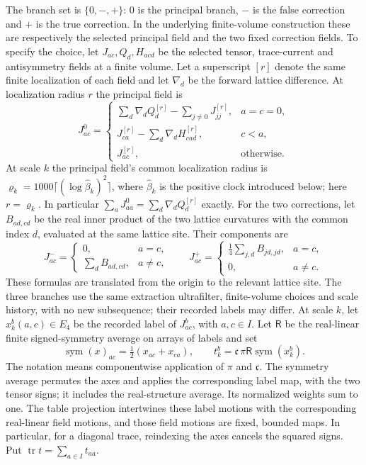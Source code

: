 The branch set is $\{0,-,+\}$: $0$ is the principal branch, $-$ is the
false correction and $+$ is the true correction. In the underlying
finite-volume construction these are respectively the selected principal
field and the two fixed correction fields. To specify the choice, let
$J_{ac},Q_d,H_{acd}$ be the selected tensor, trace-current and antisymmetry
fields at a finite volume. Let a superscript $[r]$ denote the same finite
localization of each field and let $\nabla_d$ be the forward lattice
difference. At localization radius $r$ the principal field is
\[
 J^0_{ac}=\begin{cases}
 \sum_d\nabla_d Q_d^{[r]}-\sum_{j\ne0}J_{jj}^{[r]},&a=c=0,\\
 J_{ca}^{[r]}-\sum_d\nabla_d H_{cad}^{[r]},&c<a,\\
 J_{ac}^{[r]},&\text{otherwise}.
 \end{cases}
\]
At scale $k$ the principal field's common localization radius is
$\varrho_k=1000\lceil(\log\widehat\beta_k)^2\rceil$, where $\widehat\beta_k$
is the positive clock introduced below; here $r=\varrho_k$. In particular $\sum_aJ^0_{aa}=\sum_d\nabla_dQ_d^{[r]}$ exactly. For the two
corrections, let $B_{ad,cd}$ be the real inner product of the two lattice
curvatures with the common index $d$, evaluated at the same lattice site.
Their components are
\[
 J^-_{ac}=\begin{cases}0,&a=c,\\\sum_d B_{ad,cd},&a\ne c,\end{cases}
 \qquad
 J^+_{ac}=\begin{cases}\frac14\sum_{j,d}B_{jd,jd},&a=c,\\
 0,&a\ne c.\end{cases}
\]
These formulas are translated from the origin to the relevant lattice site.
The three branches use the same extraction ultrafilter, finite-volume
choices and scale history, with no new subsequence; their recorded labels may
differ. At scale $k$, let $x^b_k(a,c)\in E_4$ be the recorded
label of $J^b_{ac}$, with $a,c\in I$. Let $\mathsf R$ be the
real-linear finite signed-symmetry average on arrays of labels and set
\[
 \operatorname{sym}(x)_{ac}=\tfrac12(x_{ac}+x_{ca}),\qquad
 t^b_k=\mathfrak c\,\pi\mathsf R\operatorname{sym}(x^b_k).
\]
The notation means componentwise application of $\pi$ and $\mathfrak c$.
The symmetry average permutes the axes and applies the corresponding label
map, with the two tensor signs; it includes the real-structure average.
Its normalized weights sum to one. The table projection intertwines these
label motions with the corresponding real-linear field motions, and those
field motions are fixed, bounded maps. In particular, for a diagonal trace,
reindexing the axes cancels the squared signs. Put
$\operatorname{tr}t=\sum_{a\in I}t_{aa}$.

